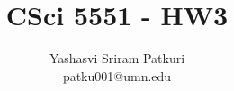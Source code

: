 \documentclass[12pt]{article}
\title{CSci 5551 - HW3}
\author{Yashasvi Sriram Patkuri\\patku001@umn.edu}
\begin{document}
\maketitle
\pagebreak

\section{}
\section{}
\section{}
\section{}
\end{document}
